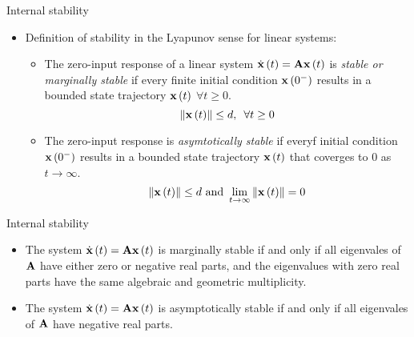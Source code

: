\documentclass[aspectratio=169]{beamer}
\let\olditem\item
\renewcommand{\item}{\setlength{\itemsep}{\fill}\olditem}
\def\mf{\ensuremath\mathbf}
\def\lp{\ensuremath\left(}
\def\rp{\ensuremath\right)}
\def\lV{\ensuremath\left\lVert}
\def\rV{\ensuremath\right\rVert}
\newcommand{\ct}[1]{\lp #1\rp}
\begin{document}
\begin{frame}[t]{Internal stability}
\begin{itemize}
    \item Definition of stability in the Lyapunov sense for linear systems: 
    \begin{itemize}
        \item The zero-input response of a linear system $\dot{\mf{x}}\ct{t} = \mf{A}\mf{x}\ct{t}$ is \textit{stable or marginally stable} if every finite initial condition $\mf{x}\ct{0^-}$ results in a bounded state trajectory $\mf{x}\ct{t}$ $\forall t \geq 0$.
        \[ \lV \mf{x}\ct{t}\rV \leq d, \,\,\, \forall t \geq 0 \]

        \item The zero-input response is \textit{asymtotically stable} if everyf initial condition $\mf{x}\ct{0^-}$ results in a bounded state trajectory $\mf{x}\ct{t}$ that coverges to $0$ as $t \to \infty$.
        \[ \lV \mf{x}\ct{t}\rV \leq d \text{ and } \lim_{t \to \infty} \lV \mf{x}\ct{t}\rV = 0 \]
    \end{itemize}
\end{itemize}
\end{frame}


\begin{frame}[t]{Internal stability}
\begin{itemize}
    \item The system $\dot{\mf{x}}\ct{t} = \mf{A}\mf{x}\ct{t}$ is marginally stable if and only if all eigenvales of $\mf{A}$ have either zero or negative real parts, and the eigenvalues with zero real parts have the same algebraic and geometric multiplicity.

    \item  The system $\dot{\mf{x}}\ct{t} = \mf{A}\mf{x}\ct{t}$ is asymptotically stable if and only if all eigenvales of $\mf{A}$ have  negative real parts.
\end{itemize}
\end{frame}
\end{document}
